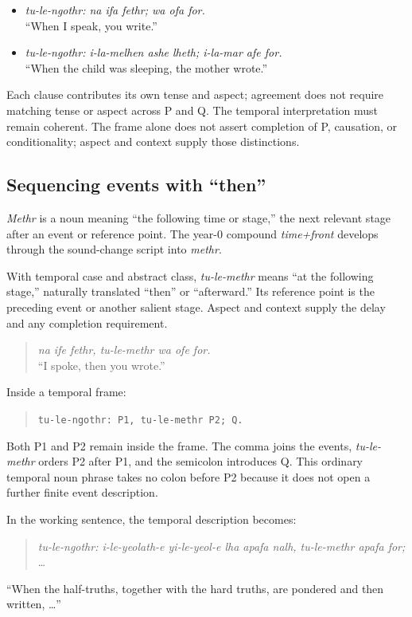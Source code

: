 \begin{itemize}
\item \textit{tu-le-ngothr: na ifa fethr; wa ofa for.}\\
``When I speak, you write.''
\item \textit{tu-le-ngothr: i-la-melhen ashe lheth; i-la-mar afe for.}\\
``When the child was sleeping, the mother wrote.''
\end{itemize}

Each clause contributes its own tense and aspect; agreement does not require matching tense or aspect across P and Q. The temporal interpretation must remain coherent. The frame alone does not assert completion of P, causation, or conditionality; aspect and context supply those distinctions.

\subsection*{Sequencing events with ``then''}

\textit{Methr} is a noun meaning ``the following time or stage,'' the next relevant stage after an event or reference point. The year-0 compound \textit{time+front} develops through the sound-change script into \textit{methr}.

With temporal case and abstract class, \textit{tu-le-methr} means ``at the following stage,'' naturally translated ``then'' or ``afterward.'' Its reference point is the preceding event or another salient stage. Aspect and context supply the delay and any completion requirement.

\begin{quote}
\textit{na ife fethr, tu-le-methr wa ofe for.}\\
``I spoke, then you wrote.''
\end{quote}

Inside a temporal frame:
\begin{quote}
\texttt{tu-le-ngothr: P1, tu-le-methr P2; Q.}
\end{quote}
Both P1 and P2 remain inside the frame. The comma joins the events, \textit{tu-le-methr} orders P2 after P1, and the semicolon introduces Q. This ordinary temporal noun phrase takes no colon before P2 because it does not open a further finite event description.

In the working sentence, the temporal description becomes:
\begin{quote}
\textit{tu-le-ngothr: i-le-yeolath-e yi-le-yeol-e lha apafa nalh, tu-le-methr apafa for;} \ldots
\end{quote}
``When the half-truths, together with the hard truths, are pondered and then written, \ldots''

